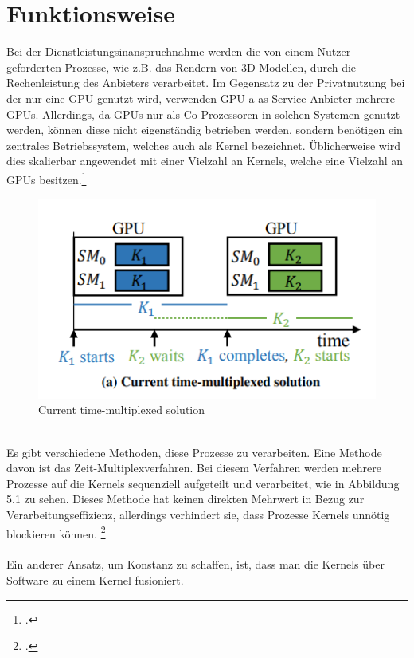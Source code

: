 \documentclass[12pt,toc=bib,toc=listof]{scrreprt}
\begin{document}
\section{Funktionsweise}
\label{sec: Funktionsweise}

Bei der Dienstleistungsinanspruchnahme werden die von einem Nutzer geforderten
Prozesse, wie z.B. das Rendern von 3D-Modellen, durch die Rechenleistung des 
Anbieters verarbeitet. Im Gegensatz zu der Privatnutzung bei der nur eine GPU genutzt wird, 
verwenden GPU a as Service-Anbieter mehrere GPUs. 
Allerdings, da GPUs nur als Co-Prozessoren in solchen Systemen genutzt werden, 
können diese nicht eigenständig betrieben werden, sondern benötigen ein zentrales 
Betriebssystem, welches auch als Kernel bezeichnet. Üblicherweise wird dies skalierbar angewendet mit einer
Vielzahl an Kernels, welche eine Vielzahl an GPUs besitzen.\footcite [Vgl.] [] {Wang.2017}
\\%
\begin{figure}[h]
 \centering
  \includegraphics[scale=1.4]{Abbildungen/wang1.png} 
  \caption[Wang u. a. (2017)]{Current time-multiplexed solution}
\end{figure}
\\%
Es gibt verschiedene Methoden, diese Prozesse zu verarbeiten. Eine Methode davon 
ist das Zeit-Multiplexverfahren. Bei diesem Verfahren werden mehrere Prozesse auf die Kernels
sequenziell aufgeteilt und verarbeitet, wie in Abbildung 5.1 zu sehen. Dieses Methode 
hat keinen direkten Mehrwert in Bezug zur Verarbeitungseffizienz, allerdings verhindert 
sie, dass Prozesse Kernels unnötig blockieren können. \footcite [Vgl.] [] {Wang.2017}
\\ \\
Ein anderer Ansatz, um Konstanz zu schaffen, ist, dass man die Kernels über Software zu einem Kernel fusioniert. 
\end{document}
